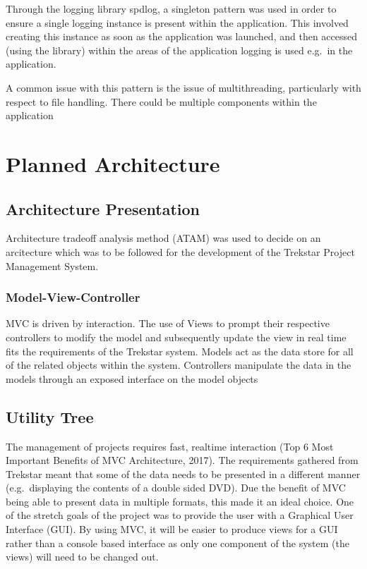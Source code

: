 \documentclass[
  english,
  a4paper,
,tablecaptionabove
]{scrartcl}
\begin{document}
Through the logging library spdlog, a singleton pattern was used in
order to ensure a single logging instance is present within the
application. This involved creating this instance as soon as the
application was launched, and then accessed (using the library) within
the areas of the application logging is used e.g.~in the application.

A common issue with this pattern is the issue of multithreading,
particularly with respect to file handling. There could be multiple
components within the application

\newpage

\hypertarget{planned-architecture}{%
\section{Planned Architecture}\label{planned-architecture}}

\hypertarget{architecture-presentation}{%
\subsection{Architecture Presentation}\label{architecture-presentation}}

Architecture tradeoff analysis method (ATAM) was used to decide on an
arcitecture which was to be followed for the development of the Trekstar
Project Management System.

\hypertarget{model-view-controller}{%
\subsubsection{Model-View-Controller}\label{model-view-controller}}

MVC is driven by interaction. The use of Views to prompt their
respective controllers to modify the model and subsequently update the
view in real time fits the requirements of the Trekstar system. Models
act as the data store for all of the related objects within the system.
Controllers manipulate the data in the models through an exposed
interface on the model objects

\hypertarget{utility-tree}{%
\subsection{Utility Tree}\label{utility-tree}}

The management of projects requires fast, realtime interaction (Top 6
Most Important Benefits of MVC Architecture, 2017). The requirements
gathered from Trekstar meant that some of the data needs to be presented
in a different manner (e.g.~displaying the contents of a double sided
DVD). Due the benefit of MVC being able to present data in multiple
formats, this made it an ideal choice. One of the stretch goals of the
project was to provide the user with a Graphical User Interface (GUI).
By using MVC, it will be easier to produce views for a GUI rather than a
console based interface as only one component of the system (the views)
will need to be changed out.
\end{document}

